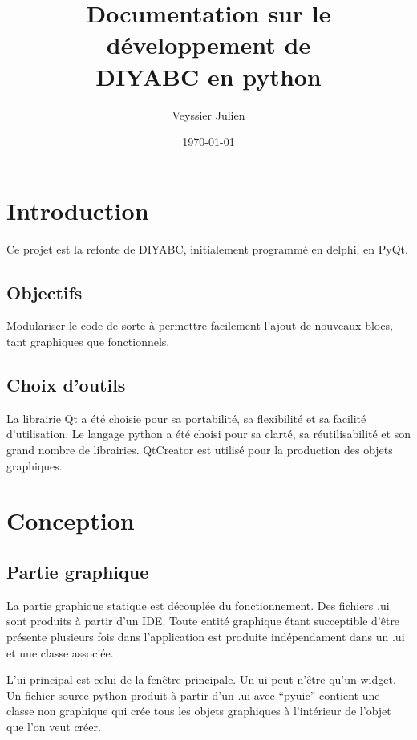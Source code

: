 \documentclass[12pt,a4paper]{article}
\author{Veyssier Julien}
\title{Documentation sur le développement de \\
DIYABC en python}
\date\today
\begin{document}
\maketitle
\newpage

\tableofcontents

\newpage
 

\section{Introduction}
Ce projet est la refonte de DIYABC, initialement programmé en delphi, en PyQt.
	\subsection{Objectifs}
        Modulariser le code de sorte à permettre facilement l'ajout de nouveaux blocs, tant graphiques que fonctionnels.

	\subsection{Choix d'outils}
        La librairie Qt a été choisie pour sa portabilité, sa flexibilité et sa facilité d'utilisation. Le langage python 
        a été choisi pour sa clarté, sa réutilisabilité et son grand nombre de librairies. QtCreator est utilis\'e pour
        la production des objets graphiques.

\section{Conception}
    \subsection{Partie graphique}
        La partie graphique statique est découplée du fonctionnement. Des fichiers .ui sont produits à partir d'un IDE. Toute entité graphique
        étant succeptible d'être présente plusieurs fois dans l'application est produite indépendament dans un .ui et une classe associée.
        
        L'ui principal est celui de la fenêtre principale.
        Un ui peut n'être qu'un widget. Un fichier source python produit à partir d'un .ui avec ``pyuic'' contient une classe non graphique
        qui crée tous les objets graphiques à l'intérieur de l'objet que l'on veut créer.
\end{document}
